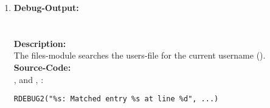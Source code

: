 \begin{enumerate}
\item \textbf{Debug-Output:}\\
\\
\\
\newline
\textbf{Description:}\\
The files-module searches the users-file for the current username ().\\
\newline
\textbf{Source-Code:}\\
,  and , :
\begin{lstlisting}
RDEBUG2("%s: Matched entry %s at line %d", ...)
\end{lstlisting}
\end{enumerate}

\newpage


